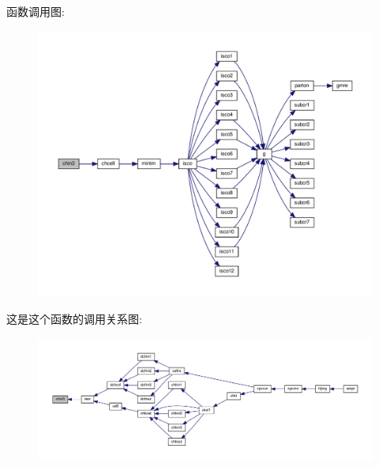 函数调用图\+:
\nopagebreak
\begin{figure}[H]
\begin{center}
\leavevmode
\includegraphics[width=350pt]{chin3_8f90_a8724e2ebbfef99c2f7f07b42f89621b9_cgraph}
\end{center}
\end{figure}
这是这个函数的调用关系图\+:
\nopagebreak
\begin{figure}[H]
\begin{center}
\leavevmode
\includegraphics[width=350pt]{chin3_8f90_a8724e2ebbfef99c2f7f07b42f89621b9_icgraph}
\end{center}
\end{figure}
